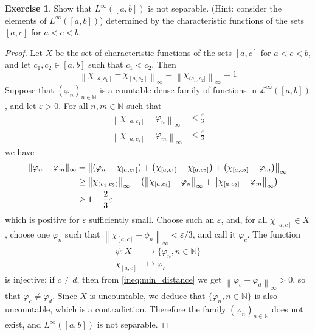 \documentclass[11pt,a4paper,twoside]{article}
\theoremstyle{definition}
\newcounter{excounter}
\newtheorem{exercise}[excounter]{Exercise}
\begin{document}
\begin{exercise}

  Show that $L^\infty ( [ a, b ] )$ is not separable. (Hint: consider the elements of $L^\infty ( [ a, b ] )$)
  determined by the characteristic functions of the sets $[ a, c ]$ for $a < c < b$.

\end{exercise}

\begin{proof}

  Let $X$ be the set of characteristic functions of the sets $[ a, c ]$ for $a < c < b$,
  and let $c_1, c_2 \in [ a, b ]$ such that $c_1 < c_2$. Then
  \begin{equation*}
    \left\| \chi_{[ a, c_1 ]} - \chi_{[ a, c_2 ]} \right\|_\infty = \left\| \chi_{( c_1, c_2 ]} \right\|_\infty = 1
  \end{equation*}
  Suppose that $\left( \varphi_n \right)_{n \in \mathbb{N}}$ is a countable dense family of functions in $\mathscr{L}^\infty ( [ a, b ] )$,
  and let $\varepsilon > 0$. For all $n, m \in \mathbb{N}$ such that
  \begin{align*}
    \left\| \chi_{[ a, c_1 ]} - \varphi_n \right\|_\infty &< \frac{\varepsilon}{3} \\
    \left\| \chi_{[ a, c_2 ]} - \varphi_m \right\|_\infty &< \frac{\varepsilon}{3}
  \end{align*}
  we have
  \begin{align} \label{ineq:min_distance}
    \| \varphi_n - \varphi_m \|_\infty &= \left\| ( \varphi_n - \chi_{[ a, c_1 ]} )
    + \left( \chi_{[ a, c_1 ]} - \chi_{[ a, c_2 ]} \right)
    + \left( \chi_{[a, c_2]} - \varphi_m \right) \right\|_\infty \notag \\
    &\geq \left\| \chi_{( c_1, c_2 )} \right\|_\infty - \left( \left\| \chi_{[ a, c_1 ]} - \varphi_n \right\|_\infty + \left\| \chi_{[ a, c_2 ]} - \varphi_m \right\|_\infty \right) \notag \\
    &\geq 1 - \frac{2}{3} \varepsilon
  \end{align}
  which is positive for $\varepsilon$ sufficiently small. Choose such an $\varepsilon$, and, for all $\chi_{[ a, c ]} \in X$,
  choose one $\varphi_n$ such that $\left\| \chi_{[ a, c ]} - \phi_n \right\|_\infty < \varepsilon / 3$,
  and call it $\varphi_c$. The function
  \begin{align*}
    \psi : X &\to \{ \varphi_n, n \in \mathbb{N} \} \\
    \chi_{[ a, c ]} &\mapsto \varphi_c
  \end{align*}
  is injective: if $c \neq d$, then from \eqref{ineq:min_distance} we get $\left\| \varphi_c - \varphi_d \right\|_\infty > 0$,
  so that $\varphi_c \neq \varphi_d$. Since $X$ is uncountable, we deduce that $\{ \varphi_n, n \in \mathbb{N} \}$ is also uncountable,
  which is a contradiction. Therefore the family $\left( \varphi_n \right)_{n \in \mathbb{N}}$ does not exist, and $L^\infty ( [ a, b ] )$
  is not separable.

\end{proof}
\end{document}
